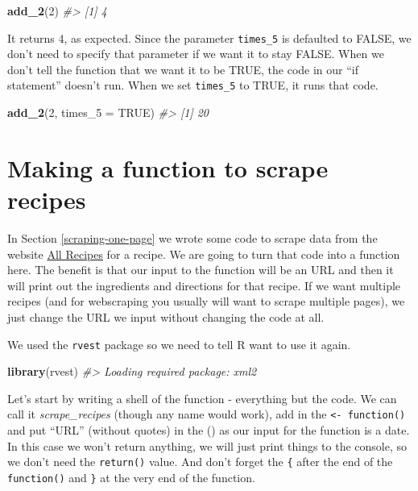 \documentclass[
  12pt,
]{book}
\newenvironment{Shaded}{\begin{snugshade}}{\end{snugshade}}
\newcommand{\CommentTok}[1]{\textcolor[rgb]{0.56,0.35,0.01}{\textit{#1}}}
\newcommand{\DataTypeTok}[1]{\textcolor[rgb]{0.13,0.29,0.53}{#1}}
\newcommand{\DecValTok}[1]{\textcolor[rgb]{0.00,0.00,0.81}{#1}}
\newcommand{\KeywordTok}[1]{\textcolor[rgb]{0.13,0.29,0.53}{\textbf{#1}}}
\newcommand{\NormalTok}[1]{#1}
\newcommand{\OtherTok}[1]{\textcolor[rgb]{0.56,0.35,0.01}{#1}}
\begin{document}
\begin{Shaded}
\begin{Highlighting}[]
\KeywordTok{add\_2}\NormalTok{(}\DecValTok{2}\NormalTok{)}
\CommentTok{\#> [1] 4}
\end{Highlighting}
\end{Shaded}

It returns 4, as expected. Since the parameter \texttt{times\_5} is defaulted to FALSE, we don't need to specify that parameter if we want it to stay FALSE. When we don't tell the function that we want it to be TRUE, the code in our ``if statement'' doesn't run. When we set \texttt{times\_5} to TRUE, it runs that code.

\begin{Shaded}
\begin{Highlighting}[]
\KeywordTok{add\_2}\NormalTok{(}\DecValTok{2}\NormalTok{, }\DataTypeTok{times\_5 =} \OtherTok{TRUE}\NormalTok{)}
\CommentTok{\#> [1] 20}
\end{Highlighting}
\end{Shaded}

\hypertarget{recipes-function}{%
\section{Making a function to scrape recipes}\label{recipes-function}}

In Section \ref{scraping-one-page} we wrote some code to scrape data from the website \href{https://www.allrecipes.com/}{All Recipes} for a recipe. We are going to turn that code into a function here. The benefit is that our input to the function will be an URL and then it will print out the ingredients and directions for that recipe. If we want multiple recipes (and for webscraping you usually will want to scrape multiple pages), we just change the URL we input without changing the code at all.

We used the \texttt{rvest} package so we need to tell R want to use it again.

\begin{Shaded}
\begin{Highlighting}[]
\KeywordTok{library}\NormalTok{(rvest)}
\CommentTok{\#> Loading required package: xml2}
\end{Highlighting}
\end{Shaded}

Let's start by writing a shell of the function - everything but the code. We can call it \emph{scrape\_recipes} (though any name would work), add in the \texttt{\textless{}-\ function()} and put ``URL'' (without quotes) in the () as our input for the function is a date. In this case we won't return anything, we will just print things to the console, so we don't need the \texttt{return()} value. And don't forget the \texttt{\{} after the end of the \texttt{function()} and \texttt{\}} at the very end of the function.
\end{document}

